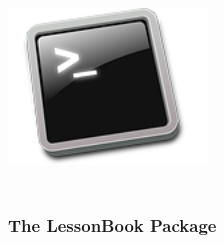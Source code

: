 \documentclass[11pt]{article}
\begin{document}
	\paragraph{} \paragraph{}

	\hrulefill

	\paragraph{} \paragraph{}

	\begin{center}
		\graphicspath{ {.} }
		\includegraphics[width=200px,height=200px,keepaspectratio]{bash.png}
		\centering
		\vfill
	\end{center}

	\newpage

	\subsubsection{The LessonBook Package}
\end{document}
